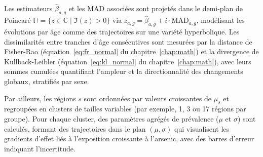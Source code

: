 Les estimateurs $\hat{\beta}_{a,g}$ et les MAD associées sont projetés dans le demi-plan de Poincaré $\mathbb{H} = \{ z \in \mathbb{C} \mid \Im(z) > 0 \}$ via $z_{a,g} = \hat{\beta}_{a,g} + i \cdot \mathrm{MAD}_{a,g}$, modélisant les évolutions par âge comme des trajectoires sur une variété hyperbolique. Les dissimilarités entre tranches d'âge consécutives sont mesurées par la distance de Fisher-Rao (équation~\eqref{eq:fr_normal} du chapitre~\ref{chap:math}) et la divergence de Kullback-Leibler (équation~\eqref{eq:kl_normal} du chapitre~\ref{chap:math}), avec leurs sommes cumulées quantifiant l'ampleur et la directionnalité des changements globaux, stratifiés par sexe.

Par ailleurs, les régions $s$ sont ordonnées par valeurs croissantes de $\mu_s$ et regroupées en clusters de tailles variables (par exemple, 1, 3 ou 17 régions par groupe). Pour chaque cluster, des paramètres agrégés de prévalence ($\mu$ et $\sigma$) sont calculés, formant des trajectoires dans le plan $(\mu, \sigma)$ qui visualisent les gradients d'effet liés à l'exposition croissante à l'arsenic, avec des barres d'erreur indiquant l'incertitude.
